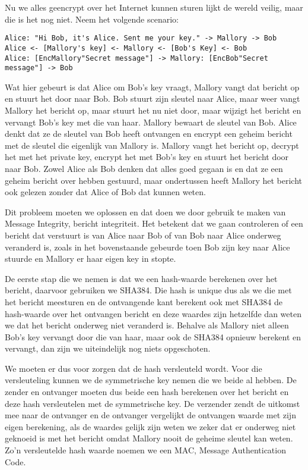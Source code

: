 Nu we alles geencrypt over het Internet kunnen sturen lijkt de wereld veilig, maar die is het nog niet. Neem het volgende scenario:
\begin{lstlisting}
Alice: "Hi Bob, it's Alice. Sent me your key." -> Mallory -> Bob
Alice <- [Mallory's key] <- Mallory <- [Bob's Key] <- Bob
Alice: [EncMallory"Secret message"] -> Mallory: [EncBob"Secret message"] -> Bob
\end{lstlisting}

Wat hier gebeurt is dat Alice om Bob's key vraagt, Mallory vangt dat bericht op en stuurt het door naar Bob. Bob stuurt zijn sleutel naar Alice, maar weer vangt Mallory het bericht op, maar stuurt het nu niet door, maar wijzigt het bericht en vervangt Bob's key met die van haar. Mallory bewaart de sleutel van Bob. Alice denkt dat ze de sleutel van Bob heeft ontvangen en encrypt een geheim bericht met de sleutel die eigenlijk van Mallory is. Mallory vangt het bericht op, decrypt het met het private key, encrypt het met Bob's key en stuurt het bericht door naar Bob. Zowel Alice als Bob denken dat alles goed gegaan is en dat ze een geheim bericht over hebben gestuurd, maar ondertussen heeft Mallory het bericht ook gelezen zonder dat Alice of Bob dat kunnen weten.

Dit probleem moeten we oplossen en dat doen we door gebruik te maken van Message Integrity, bericht integriteit. Het betekent dat we gaan controleren of een bericht dat verstuurt is van Alice naar Bob of van Bob naar Alice onderweg veranderd is, zoals in het bovenstaande gebeurde toen Bob zijn key naar Alice stuurde en Mallory er haar eigen key in stopte.

De eerste stap die we nemen is dat we een hash-waarde berekenen over het bericht, daarvoor gebruiken we SHA384. Die hash is unique dus als we die met het bericht meesturen en de ontvangende kant berekent ook met SHA384 de hash-waarde over het ontvangen bericht en deze waardes zijn hetzelfde dan weten we dat het bericht onderweg niet veranderd is. Behalve als Mallory niet alleen Bob's key vervangt door die van haar, maar ook de SHA384 opnieuw berekent en vervangt, dan zijn we uiteindelijk nog niets opgeschoten.

We moeten er dus voor zorgen dat de hash versleuteld wordt. Voor die versleuteling kunnen we de symmetrische key nemen die we beide al hebben. De zender en ontvanger moeten dus beide een hash berekenen over het bericht en deze hash versleutelen met de symmetrische key. De verzender zendt de uitkomst mee naar de ontvanger en de ontvanger vergelijkt de ontvangen waarde met zijn eigen berekening, als de waardes gelijk zijn weten we zeker dat er onderweg niet geknoeid is met het bericht omdat Mallory nooit de geheime sleutel kan weten. Zo'n versleutelde hash waarde noemen we een MAC, Message Authentication Code.
